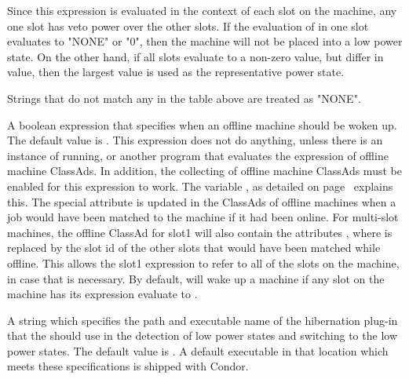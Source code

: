 \begin{description}
  Since this expression is evaluated in the context of each slot on the
  machine, any one slot has veto power over the other slots.  If the 
  evaluation of  in one slot evaluates to "NONE"
  or "0", then the machine will not be placed into a low power
  state.  On the other 
  hand, if all slots evaluate to a non-zero value, but differ in value, 
  then the largest value is used as the representative power state.

  Strings that do not match any in the table above are treated as
  "NONE".

\label{param:Unhibernate}
\item[\Macro{UNHIBERNATE}]
  A boolean expression that specifies when an offline machine should be
  woken up.
  The default value is .
  This expression does not do anything,
  unless there is an instance of  running,
  or another program that evaluates the
   expression of offline machine ClassAds.
  In addition, the collecting of offline machine ClassAds must be enabled
  for this expression to work.  The variable , as
  detailed on page~\pageref{param:OfflineLog} explains this.
  The special attribute
   is updated in the ClassAds of offline machines
  when a job would have been matched to the machine if it had been online.
  For multi-slot machines, the offline ClassAd for slot1 will also contain
  the attributes ,
  where  is replaced by the
  slot id of the other slots that would have been matched while offline.
  This allows the slot1  expression to refer to
  all of the slots on the machine, in case that is necessary.
  By default,
   will wake up a machine if any slot on the machine has
  its  expression evaluate to .

\label{param:HibernationPlugin}
\item[\Macro{HIBERNATION\_PLUGIN}]
  A string which specifies the path and executable name of 
  the hibernation plug-in that the  should use 
  in the detection of low power states and switching to the low power states.
  The default value is .  
  A default executable in that location which meets these specifications is
  shipped with Condor. 


\end{description}
